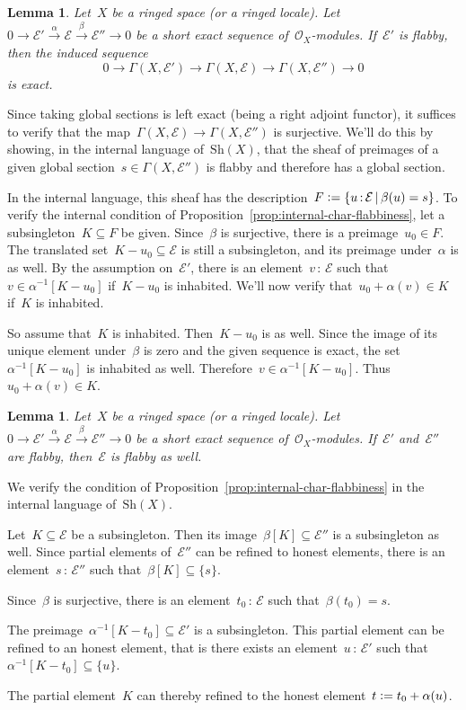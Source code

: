 \documentclass[10pt,reqno,a4paper]{amsbook}
\makeatletter
\theoremstyle{definition}
\theoremstyle{plain}
\newtheorem{lemma}[defn]{Lemma}
\theoremstyle{remark}
\newcommand{\E}{\mathcal{E}}
\renewcommand{\O}{\mathcal{O}}
\newcommand{\Sh}{\mathrm{Sh}}
\newcommand{\?}{\,{:}\,}
\renewcommand{\_}{\mathpunct{.}\,}
\newcommand{\xra}{\xrightarrow}
\newcommand{\defeq}{\vcentcolon=}
\renewenvironment{proof}[1][\proofname]{\par
  \pushQED{\qed}%
  \normalfont \topsep6\p@\@plus6\p@\relax
  \trivlist
  \item[\hskip\labelsep
        \itshape
    #1\@addpunct{.}]\ignorespaces
}{%
  \popQED\endtrivlist\@endpefalse
}
\makeatother
\begin{document}
\begin{lemma}Let~$X$ be a ringed space (or a ringed locale). Let~$0 \to \E'
\xra{\alpha} \E \xra{\beta} \E'' \to 0$ be a short exact sequence
of~$\O_X$-modules. If~$\E'$ is flabby, then the induced sequence
\[ 0 \longrightarrow \Gamma(X,\E')
  \longrightarrow \Gamma(X,\E)
  \longrightarrow \Gamma(X,\E'') \longrightarrow 0 \]
is exact.
\end{lemma}

\begin{proof}Since taking global sections is left exact (being a right adjoint
functor), it suffices to verify that the map~$\Gamma(X,\E) \to \Gamma(X,\E'')$
is surjective. We'll do this by showing, in the internal language of~$\Sh(X)$,
that the sheaf of preimages of a given global section~$s \in \Gamma(X,\E'')$ is
flabby and therefore has a global section.

In the internal language, this sheaf has the description~$F \defeq \{ u \? \E
\,|\, \beta(u) = s \}$. To verify the internal condition of
Proposition~\ref{prop:internal-char-flabbiness}, let a subsingleton~$K \subseteq
F$ be given. Since~$\beta$ is surjective, there is a preimage~$u_0 \in F$.
The translated set~$K - u_0 \subseteq \E$ is still a subsingleton, and its
preimage under~$\alpha$ is as well. By the assumption on~$\E'$, there is an
element~$v \? \E$ such that~$v \in \alpha^{-1}[K - u_0]$ if~$K - u_0$ is
inhabited. We'll now verify that~$u_0 + \alpha(v) \in K$ if~$K$ is inhabited.

So assume that~$K$ is inhabited. Then~$K - u_0$ is as well. Since the image of
its unique element under~$\beta$ is zero and the given sequence is exact, the
set~$\alpha^{-1}[K - u_0]$ is inhabited as well. Therefore~$v \in \alpha^{-1}[K
- u_0]$. Thus~$u_0 + \alpha(v) \in K$.
\end{proof}

\begin{lemma}Let~$X$ be a ringed space (or a ringed locale). Let~$0 \to \E'
\xra{\alpha} \E \xra{\beta} \E'' \to 0$ be a short exact sequence
of~$\O_X$-modules. If~$\E'$ and~$\E''$ are flabby, then~$\E$ is flabby as well.
\end{lemma}

\begin{proof}We verify the condition of
Proposition~\ref{prop:internal-char-flabbiness} in the internal language
of~$\Sh(X)$.

Let~$K \subseteq \E$ be a subsingleton. Then its image~$\beta[K] \subseteq \E''$
is a subsingleton as well. Since partial elements of~$\E''$ can be refined to
honest elements, there is an element~$s \? \E''$ such that~$\beta[K] \subseteq
\{ s \}$.

Since~$\beta$ is surjective, there is an element~$t_0 \? \E$ such
that~$\beta(t_0) = s$.

The preimage~$\alpha^{-1}[K - t_0] \subseteq \E'$ is a subsingleton. This
partial element can be refined to an honest element, that is there exists an
element~$u \? \E'$ such that~$\alpha^{-1}[K - t_0] \subseteq \{u\}$.

The partial element~$K$ can thereby refined to the honest element~$t \defeq t_0 + \alpha(u)$.
\end{proof}
\end{document}
